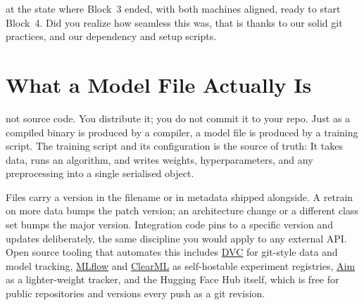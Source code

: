  at the state where Block~3 ended, with both machines
aligned, ready to start Block~4. Did you realize how seamless this was, that is thanks to 
our solid git practices, and our dependency and setup scripts.




\newpage
\section{What a Model File Actually Is}

 not source code.
You distribute it; you do not commit it to your repo.
Just as a compiled binary is produced by a compiler, a model file is produced
by a training script.
The training script and its configuration is the source of truth: It takes data, runs an algorithm,
and writes weights, hyperparameters, and any preprocessing into a single
serialised object.


Files carry a version in the filename or in metadata shipped alongside.
A retrain on more data bumps the patch version; an architecture change or
a different class set bumps the major version.
Integration code pins to a specific version and updates deliberately,
the same discipline you would apply to any external API.
Open source tooling that automates this includes
\href{https://dvc.org}{DVC} for git-style data and model tracking,
\href{https://mlflow.org}{MLflow} and
\href{https://clear.ml}{ClearML} as self-hostable experiment registries,
\href{https://aimstack.io}{Aim} as a lighter-weight tracker,
and the Hugging Face Hub itself, which is free for public repositories
and versions every push as a git revision.


